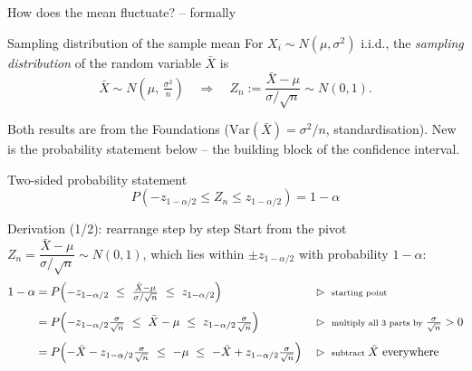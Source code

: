 \documentclass[aspectratio=169,11pt]{beamer}
\begin{document}
\begin{frame}{How does the mean fluctuate? -- formally}
  \begin{block}{Sampling distribution of the sample mean}
    For $X_i \sim N(\mu,\sigma^{2})$ i.i.d., the \emph{sampling distribution} of
    the random variable $\bar X$ is
    \[
      \bar{X} \sim N\!\left(\mu,\,\tfrac{\sigma^{2}}{n}\right)
      \quad\Longrightarrow\quad
      Z_n := \frac{\bar{X}-\mu}{\sigma/\sqrt{n}} \sim N(0,1).
    \]
  \end{block}
  {\footnotesize Both results are from the Foundations ($\mathrm{Var}(\bar X)=
  \sigma^2/n$, standardisation). New is the probability statement below -- the
  building block of the confidence interval.}
  \begin{block}{Two-sided probability statement}
    \[
      P\!\left(-z_{1-\alpha/2} \le Z_n \le z_{1-\alpha/2}\right) = 1-\alpha
    \]
  \end{block}
\end{frame}

\begin{frame}{Derivation (1/2): rearrange step by step}
  \footnotesize
  Start from the pivot $Z_n=\dfrac{\bar X-\mu}{\sigma/\sqrt n}\sim N(0,1)$, which lies
  within $\pm z_{1-\alpha/2}$ with probability $1-\alpha$:
  \begin{align*}
    1-\alpha
      &= P\!\left(-z_{1-\alpha/2}\ \le\ \tfrac{\bar X-\mu}{\sigma/\sqrt n}\ \le\ z_{1-\alpha/2}\right)
         && \rhd\ \text{\scriptsize starting point}\\[4pt]
      &= P\!\left(-z_{1-\alpha/2}\tfrac{\sigma}{\sqrt n}\ \le\ \bar X-\mu\ \le\ z_{1-\alpha/2}\tfrac{\sigma}{\sqrt n}\right)
         && \rhd\ \text{\scriptsize multiply all 3 parts by }\tfrac{\sigma}{\sqrt n}>0\\[4pt]
      &= P\!\left(-\bar X-z_{1-\alpha/2}\tfrac{\sigma}{\sqrt n}\ \le\ -\mu\ \le\ -\bar X+z_{1-\alpha/2}\tfrac{\sigma}{\sqrt n}\right)
         && \rhd\ \text{\scriptsize subtract }\bar X\text{ everywhere}
  \end{align*}
\end{frame}
\end{document}
